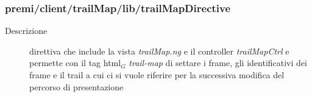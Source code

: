 \subsubsection{premi/client/trailMap/lib/trailMapDirective}

\begin{description}
\item[Descrizione] \hfill
	direttiva che include la vista \textit{trailMap.ng} e il controller \textit{trailMapCtrl} e permette con il tag html$_G$ \textit{trail-map} di settare i frame, gli identificativi dei frame e il trail a cui ci si vuole riferire per la successiva modifica del percorso di presentazione 
\end{description}
